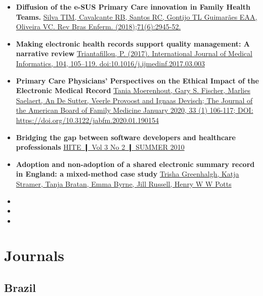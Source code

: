 \documentclass[]{book}
\begin{document}
\begin{itemize}
\item
  \textbf{Diffusion of the e-SUS Primary Care innovation in Family Health Teams.} \href{http://www.scielo.br/pdf/reben/v71n6/0034-7167-reben-71-06-2945.pdf}{Silva TIM, Cavalcante RB, Santos RC, Gontijo TL Guimarães EAA, Oliveira VC. Rev Bras Enferm. (2018);71(6):2945-52.}
\item
  \textbf{Making electronic health records support quality management: A narrative review} \href{https://sci-hub.tw/10.1016/j.ijmedinf.2017.03.003}{Triantafillou, P. (2017). International Journal of Medical Informatics, 104, 105--119. doi:10.1016/j.ijmedinf.2017.03.003}
\item
  \textbf{Primary Care Physicians' Perspectives on the Ethical Impact of the Electronic Medical Record} \href{https://www.jabfm.org/content/33/1/106.long}{Tania Moerenhout, Gary S. Fischer, Marlies Saelaert, An De Sutter, Veerle Provoost and Ignaas Devisch; The Journal of the American Board of Family Medicine January 2020, 33 (1) 106-117; DOI: https://doi.org/10.3122/jabfm.2020.01.190154}
\item
  \textbf{Bridging the gap between software developers and healthcare professionals} \href{https://www.researchgate.net/profile/William_Goossen2/publication/235672805_Bridging_the_gap_between_software_developers_and_healthcare_professionals_Model_Driven_Application_Development/links/551dc2690cf29dcabb033004.pdf}{HITE ❙ Vol 3 No 2 ❙ SUMMER 2010}
\item
  \textbf{Adoption and non-adoption of a shared electronic summary record in England: a mixed-method case study} \href{https://www.bmj.com/content/bmj/340/bmj.c3111.full.pdf}{Trisha Greenhalgh, Katja Stramer, Tanja Bratan, Emma Byrne, Jill Russell, Henry W W Potts}
\item
\item
\item
\end{itemize}

\hypertarget{journals}{%
\chapter*{Journals}\label{journals}}

\hypertarget{brazil}{%
\section*{Brazil}\label{brazil}}
\end{document}
